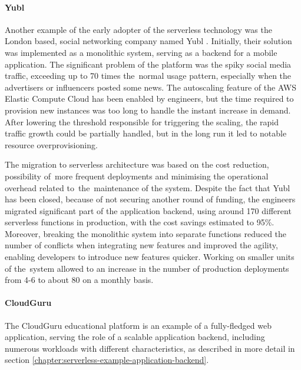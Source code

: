 \paragraph{Yubl} \label{chapter:serverless-suitability-yubl}

Another example of the early adopter of the serverless technology was the London based, social networking company named Yubl \cite{ServerlessComputingEconomicAndArchitecturalImpact}.
Initially, their solution was implemented as a monolithic system, serving as a backend for a mobile application.
The significant problem of the platform was the spiky social media traffic, exceeding up to 70 times the~normal usage pattern, especially when the advertisers or influencers posted some news.
The autoscaling feature of the AWS Elastic Compute Cloud has been enabled by engineers, but the time required to provision new instances was too long to handle the instant increase in demand.
After lowering the threshold responsible for triggering the scaling, the rapid traffic growth could be partially handled, but in the long run it led to notable resource overprovisioning.

The migration to serverless architecture was based on the cost reduction, possibility of~more frequent deployments and minimising the operational overhead related to~the~maintenance of the system.
Despite the fact that Yubl has been closed, because of not securing another round of funding, the engineers migrated significant part of the application backend, using around 170 different serverless functions in production, with the cost savings estimated to 95\%.
Moreover, breaking the monolithic system into separate functions reduced the number of conflicts when integrating new features and improved the agility, enabling developers to introduce new features quicker.
Working on smaller units of the~system allowed to an increase in the number of production deployments from 4-6 to about 80 on a monthly basis.

\paragraph{CloudGuru} \label{chapter:serverless-suitability-cloudguru}

The CloudGuru educational platform is an example of a fully-fledged web application, serving the role of a scalable application backend, including numerous workloads with different characteristics, as described in more detail in section \ref{chapter:serverless-example-application-backend}.

